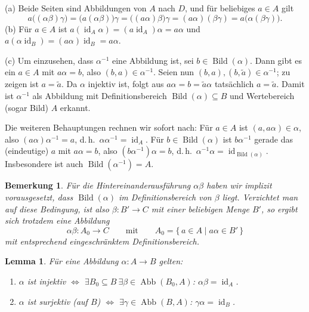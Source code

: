 \documentclass[a4paper]{article}
\makeatletter
\theoremstyle{kurzskript}
\newtheorem{lemma}[satz]{Lemma}
\newtheorem*{bem}{Bemerkung}
\renewenvironment{proof}[1][\proofname]{\par\pushQED{\qed}%
  \normalfont\topsep\medskipamount\relax
  \trivlist\item[\hskip\labelsep\bfseries #1\@addpunct{.}]\ignorespaces}%
  {\popQED\endtrivlist\@endpefalse}
\renewcommand{\proofname}{Beweis}
\makeatother
\begin{document}
\begin{proof}
(a) Beide Seiten sind Abbildungen von $A$ nach $D$, und für beliebiges $a \in A$ gilt
\[
  a\bigl((\alpha\beta)\gamma\bigr) = \bigl(a(\alpha\beta)\bigr)\gamma = \bigl((a\alpha)\beta\bigr)\gamma = (a\alpha)(\beta\gamma) = a\bigl(\alpha(\beta\gamma)\bigr).
\]
(b) Für $a \in A$ ist $a(\operatorname{id}_A\alpha) = (a \operatorname{id}_A)\alpha = a\alpha$ und $a(\alpha\operatorname{id}_B) = (a\alpha)\operatorname{id}_B = a\alpha$.

(c) Um einzusehen, dass $\alpha^{-1}$ eine Abbildung ist, sei $b \in \operatorname{Bild}(\alpha)$. Dann gibt es ein $a \in A$ mit $a\alpha = b$, also $(b, a) \in \alpha^{-1}$. Seien nun $(b, a), (b, \tilde{a}) \in \alpha^{-1}$; zu zeigen ist $a = \tilde{a}$. Da $\alpha$ injektiv ist, folgt aus $a\alpha = b = \tilde{a}\alpha$ tatsächlich $a = \tilde{a}$. Damit ist $\alpha^{-1}$ als Abbildung mit Definitionsbereich $\operatorname{Bild}(\alpha) \subseteq B$ und Wertebereich (sogar Bild) $A$ erkannt.

Die weiteren Behauptungen rechnen wir sofort nach: Für $a \in A$ ist $(a, a\alpha) \in \alpha$, also $(a\alpha)\alpha^{-1} = a$, d.\,h.\ $\alpha\alpha^{-1} = \operatorname{id}_A$. Für $b \in \operatorname{Bild}(\alpha)$ ist $b\alpha^{-1}$ gerade das (eindeutige) $a$ mit $a\alpha = b$, also $(b\alpha^{-1})\alpha = b$, d.\,h.\ $\alpha^{-1}\alpha = \operatorname{id}_{\operatorname{Bild}(\alpha)}$. Insbesondere ist auch $\operatorname{Bild}(\alpha^{-1}) = A$.
\end{proof}

\begin{bem}
Für die Hintereinanderausführung $\alpha\beta$ haben wir implizit vorausgesetzt, dass $\operatorname{Bild}(\alpha)$ im Definitionsbereich von $\beta$ liegt. Verzichtet man auf diese Bedingung, ist also $\beta\colon B' \to C$ mit einer beliebigen Menge $B'$, so ergibt sich trotzdem eine Abbildung
\[
  \alpha\beta\colon A_0 \to C \qquad\text{mit}\qquad A_0 = \{\, a \in A \mid a\alpha \in B' \,\}
\]
mit entsprechend eingeschränktem Definitionsbereich.
\end{bem}

\begin{lemma}
Für eine Abbildung $\alpha\colon A \to B$ gelten:
\begin{enumerate}[label=(\alph*)]
  \item $\alpha$ ist injektiv $\iff$ $\exists B_0 \subseteq B\ \exists \beta \in \operatorname{Abb}(B_0, A)$: $\alpha\beta = \operatorname{id}_A$.
  \item $\alpha$ ist surjektiv (auf $B$) $\iff$ $\exists \gamma \in \operatorname{Abb}(B, A)$: $\gamma\alpha = \operatorname{id}_B$.
\end{enumerate}
\end{lemma}
\end{document}
